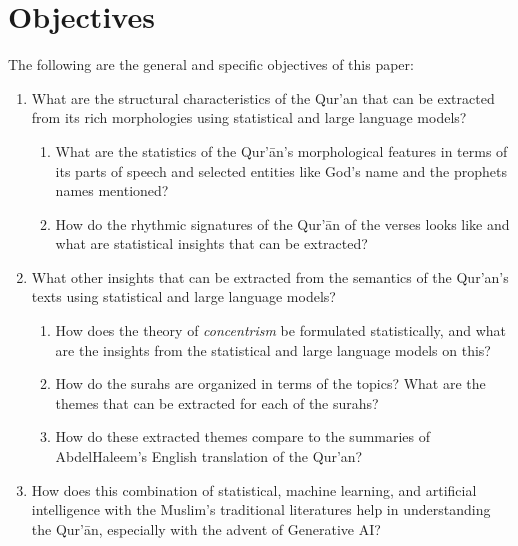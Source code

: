 \section{Objectives}\label{sec:objectives}
The following are the general and specific objectives of this paper:
\begin{enumerate}
    \item What are the structural characteristics of the Qur'an that can be extracted from its rich morphologies using statistical and large language models?
    \begin{enumerate}
        \item What are the statistics of the Qur'\=an's morphological features in terms of its parts of speech and selected entities like God's name and the prophets names mentioned?
        
        \item How do the rhythmic signatures of the Qur'\=an of the verses looks like and what are statistical insights that can be extracted?
    \end{enumerate}
    
    \item What other insights that can be extracted from the semantics of the Qur'an's texts using statistical and large language models?
    \begin{enumerate}
        \item How does the theory of \textit{concentrism} be formulated statistically, and what are the insights from the statistical and large language models on this? 
        
        \item How do the surahs are organized in terms of the topics? What are the themes that can be extracted for each of the surahs?
        
        \item How do these extracted themes compare to the summaries of Abdel\linebreak Haleem's English translation of the Qur'an?
    \end{enumerate}
    
    \item How does this combination of statistical, machine learning, and artificial intelligence with the Muslim's traditional literatures help in understanding the Qur'\=an, especially with the advent of Generative AI?
\end{enumerate}

